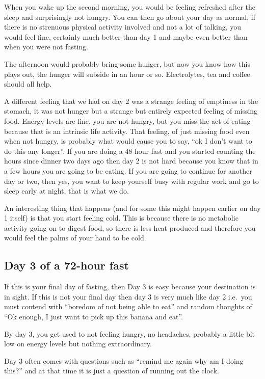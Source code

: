 \documentclass[
  oneside]{book}
\begin{document}
When you wake up the second morning, you would be feeling refreshed after the sleep and surprisingly not hungry. You can then go about your day as normal, if there is no strenuous physical activity involved and not a lot of talking, you would feel fine, certainly much better than day 1 and maybe even better than when you were not fasting.

The afternoon would probably bring some hunger, but now you know how this plays out, the hunger will subside in an hour or so. Electrolytes, tea and coffee should all help.

A different feeling that we had on day 2 was a strange feeling of emptiness in the stomach, it was not hunger but a strange but entirely expected feeling of missing food. Energy levels are fine, you are not hungry, but you miss the act of eating because that is an intrinsic life activity. That feeling, of just missing food even when not hungry, is probably what would cause you to say, ``ok I don't want to do this any longer''. If you are doing a 48-hour fast and you started counting the hours since dinner two days ago then day 2 is not hard because you know that in a few hours you are going to be eating. If you are going to continue for another day or two, then yes, you want to keep yourself busy with regular work and go to sleep early at night, that is what we do.

An interesting thing that happens (and for some this might happen earlier on day 1 itself) is that you start feeling cold. This is because there is no metabolic activity going on to digest food, so there is less heat produced and therefore you would feel the palms of your hand to be cold.

\hypertarget{day-3-of-a-72-hour-fast}{%
\subsection{Day 3 of a 72-hour fast}\label{day-3-of-a-72-hour-fast}}

If this is your final day of fasting, then Day 3 is easy because your destination is in sight. If this is not your final day then day 3 is very much like day 2 i.e.~you must contend with ``boredom of not being able to eat'' and random thoughts of ``Ok enough, I just want to pick up this banana and eat''.

By day 3, you get used to not feeling hungry, no headaches, probably a little bit low on energy levels but nothing extraordinary.

Day 3 often comes with questions such as ``remind me again why am I doing this?'' and at that time it is just a question of running out the clock.
\end{document}
